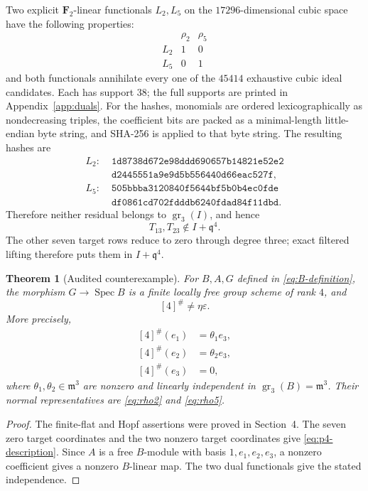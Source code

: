 \documentclass[11pt]{article}
\newtheorem{theorem}{Theorem}[section]
\theoremstyle{remark}
\newcommand{\F}{\mathbf F}
\newcommand{\Spec}{\operatorname{Spec}}
\newcommand{\gr}{\operatorname{gr}}
\newcommand{\q}{\mathfrak q}
\newcommand{\m}{\mathfrak m}
\newcommand{\eps}{\varepsilon}
\begin{document}
Two explicit \(\F_2\)-linear functionals \(L_2,L_5\) on the \(17296\)-dimensional
cubic space have the following properties:
\[
\begin{array}{c|cc}
 &\rho_2&\rho_5\\\hline
 L_2&1&0\\
 L_5&0&1
\end{array}
\]
and both functionals annihilate every one of the \(45414\) exhaustive cubic
ideal candidates.  Each has support \(38\); the full supports are printed in
Appendix~\ref{app:duals}.  For the hashes, monomials are ordered
lexicographically as nondecreasing triples, the coefficient bits are packed
as a minimal-length little-endian byte string, and SHA-256 is applied to that
byte string.  The resulting hashes are
\begin{align*}
L_2:\;&\texttt{1d8738d672e98ddd690657b14821e52e2}\\
     &\texttt{d2445551a9e9d5b556440d66eac527f},\\[2pt]
L_5:\;&\texttt{505bbba3120840f5644bf5b0b4ec0fde}\\
     &\texttt{df0861cd702fdddb6240fdad84f11dbd}.
\end{align*}
Therefore neither residual belongs to \(\gr_3(I)\), and hence
\[
  T_{13},T_{23}\notin I+\q^4.
\]
The other seven target rows reduce to zero through degree three; exact
filtered lifting therefore puts them in \(I+\q^4\).

\begin{theorem}[Audited counterexample]\label{thm:main}
For \(B,A,G\) defined in \eqref{eq:B-definition}, the morphism
\(G\to\Spec B\) is a finite locally free group scheme of rank \(4\), and
\[
  [4]^\#\ne\eta\eps.
\]
More precisely,
\begin{equation}\label{eq:p4-description}
\begin{aligned}
 [4]^\#(e_1)&=\theta_1e_3,\\
 [4]^\#(e_2)&=\theta_2e_3,\\
 [4]^\#(e_3)&=0,
\end{aligned}
\end{equation}
where \(\theta_1,\theta_2\in\m^3\) are nonzero and linearly independent in
\(\gr_3(B)=\m^3\).  Their normal representatives are
\eqref{eq:rho2} and \eqref{eq:rho5}.
\end{theorem}

\begin{proof}
The finite-flat and Hopf assertions were proved in Section~4.  The seven zero
target coordinates and the two nonzero target coordinates give
\eqref{eq:p4-description}.  Since \(A\) is a free \(B\)-module with basis
\(1,e_1,e_2,e_3\), a nonzero coefficient gives a nonzero \(B\)-linear map.
The two dual functionals give the stated independence.
\end{proof}
\end{document}
